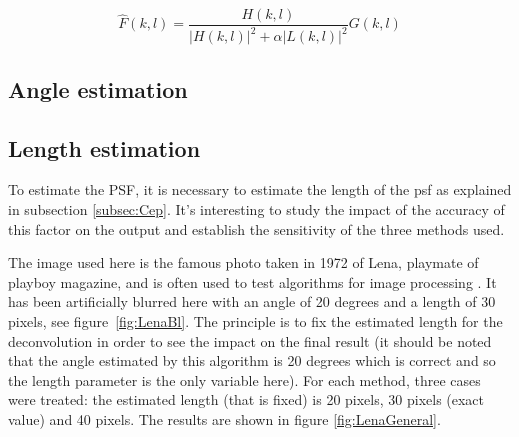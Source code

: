 \begin{equation*}
\hat{F}(k,l) = \frac{H(k,l)}{|H(k,l)|^2 + \alpha |L(k,l)|^2} G(k,l)
\label{eq:FReg}
\end{equation*}
\subsection{Angle estimation}
\label{subsec:AngleEs}



\subsection{Length estimation}
\label{subsec:LengthEs}
To estimate the PSF, it is necessary to estimate the length of the psf  as explained in subsection \ref{subsec:Cep}. It's interesting to study the impact of the accuracy of this factor on the output and establish the sensitivity of the three methods used.

The image used here is the famous photo taken in 1972 of Lena, playmate of playboy magazine, and is often used to test algorithms for image processing \cite{wikiLenna}. It has been artificially blurred here with an angle of 20 degrees and a length of 30 pixels, see figure~\ref{fig:LenaBl}. The principle is to fix the estimated length for the deconvolution in order to see the impact on the final result (it should be noted that the angle estimated by this algorithm is 20 degrees which is correct and so the length parameter is the only variable here). For each method, three cases were treated: the estimated length (that is fixed) is 20 pixels, 30 pixels (exact value) and 40 pixels.  The results are shown in figure \ref{fig:LenaGeneral}.

